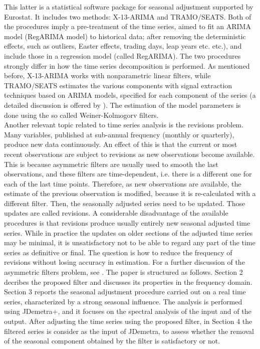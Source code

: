\documentclass[english,blauw]{cbsdiscussionpaper}
\begin{document}
This latter is  a statistical software package for seasonal adjustment supported by Eurostat. It includes two methods: X-13-ARIMA and TRAMO/SEATS. Both of the procedures imply a pre-treatment of the time series, aimed to fit an ARIMA model (RegARIMA model) to historical data; after removing the deterministic effects, such as outliers, Easter effects, trading days, leap years etc. etc.), and include those in a regression model  (called RegARIMA). The two procedures strongly differ in how the time series decomposition is performed. As mentioned before, X-13-ARIMA works with nonparametric linear filters, while TRAMO/SEATS estimates the various components with signal extraction techniques based on ARIMA models, specified for each component of the series (a detailed discussion is offered by \citep{mar2008}). The estimation of the model parameters is done using the so called Weiner-Kolmogorv filters.\\
Another relevant topic related to time series analysis is the revisions problem. Many variables, published at sub-annual frequency (monthly or quarterly), produce new data continuously. An effect of this is that the current or most recent observations are subject to revisions as new observations become available. This is because asymmetric filters are usually used to smooth the last observations, and these filters are time-dependent, i.e. there is a different one for each of the last time points. Therefore, as new observations are available, the estimate of the previous observation is modified, because it is re-calculated with a different filter. Then, the seasonally adjusted series need to be updated. Those updates are called revisions. A considerable disadvantage of the available procedures is that revisions produce usually entirely new seasonal adjusted time series. While in practice the updates on older sections of the adjusted time series may be minimal, it is unsatisfactory not to be able to regard any part of the time series as definitive or final. The question is how to reduce the frequency of revisions without losing accuracy in estimation. For a further discussion of the asymmetric filters problem, see \citep{dageal2015}.
The paper is structured as follows. Section 2 decribes the proposed filter and discusses its properties in the frequency domain. Section 3 reports the seasonal adjustment procedure carried out on a real time series, characterized by a strong seasonal influence. The analysis is performed using JDemetra+, and it focuses on the spectral analysis of the input and  of the output. After adjusting the time series using the proposed filter, in Section 4 the filtered series is consider as the input of JDemetra,  to assess whether the removal of the seasonal component obtained by the filter is satisfactory or not.\\
\end{document}

